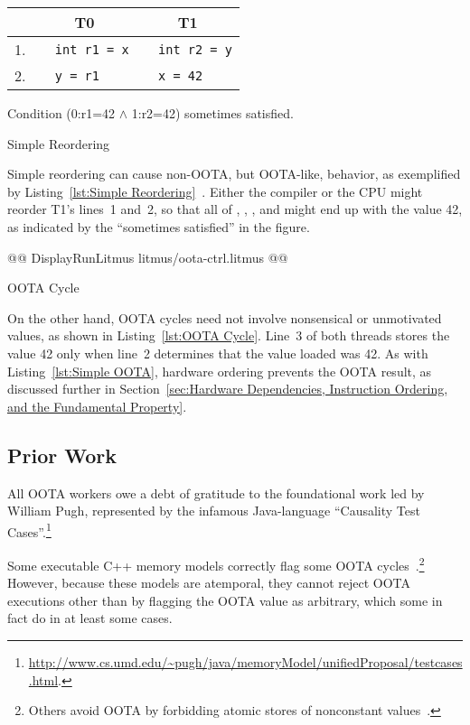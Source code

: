\begin{listing}[bp]
{
\small
\begin{tabular}{r|l|l}
& \multicolumn{1}{c}{T0} & \multicolumn{1}{c}{T1} \\
\hline
1. &
\texttt{~~int r1 = x} &
	\texttt{~~int r2 = y} \\
2. &
\texttt{~~y = r1} &
	\texttt{~~x = 42} \\
\end{tabular}

\vspace{0.1in}
Condition (0:r1=42 $\wedge$ 1:r2=42)
sometimes satisfied.
}
\caption{Simple Reordering}
\label{lst:Simple Reordering}
\end{listing}

Simple reordering can cause non-OOTA, but OOTA-like, behavior, as
exemplified by
Listing~\ref{lst:Simple Reordering}~\cite{PaulEMcKenney2020RelaxedGuideRelaxed}.
Either the compiler or the CPU might reorder T1's lines~1 and~2, so that
all of , , , and  might end up with the value 42,
as indicated by the ``sometimes satisfied'' in the figure.

\begin{listing}[tbp]
@@ DisplayRunLitmus litmus/oota-ctrl.litmus @@
\caption{OOTA Cycle}
\label{lst:OOTA Cycle}
\end{listing}

On the other hand, OOTA cycles need not involve nonsensical or
unmotivated values, as shown in
Listing~\ref{lst:OOTA Cycle}.
Line~3 of both threads stores the value 42 only when line~2 determines
that the value loaded was 42.
As with Listing~\ref{lst:Simple OOTA}, hardware ordering prevents the
OOTA result, as discussed further in
Section~\ref{sec:Hardware Dependencies, Instruction Ordering, and the Fundamental Property}.

\subsection{Prior Work}
\label{sec:Prior Work}

All OOTA workers owe a debt of gratitude to the foundational work led
by William Pugh, represented by the infamous Java-language
``Causality Test Cases''.\footnote{
	\url{http://www.cs.umd.edu/~pugh/java/memoryModel/unifiedProposal/testcases.html}.}

Some executable C++ memory models correctly flag some OOTA
cycles~\cite{JadeAlglave2014HerdingCats}.\footnote{
	Others avoid OOTA by forbidding atomic stores of nonconstant
	values~\cite{MarkBatty2011cppmem}.}
However, because these models are atemporal, they cannot reject
OOTA executions other than by flagging the OOTA value as arbitrary,
which some in fact do in at least some cases.

